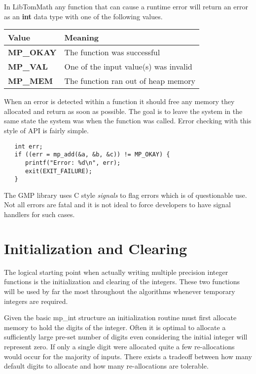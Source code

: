 \documentclass[b5paper]{book}
\begin{document}
In LibTomMath any function that can cause a runtime error will return an error as an \textbf{int} data type with one of the 
following values.

  
\begin{center}
\begin{tabular}{|l|l|}
\hline \textbf{Value} & \textbf{Meaning} \\
\hline \textbf{MP\_OKAY} & The function was successful \\
\hline \textbf{MP\_VAL}  & One of the input value(s) was invalid \\
\hline \textbf{MP\_MEM}  & The function ran out of heap memory \\
\hline
\end{tabular}
\end{center}

When an error is detected within a function it should free any memory they allocated and return as soon as possible.  The goal
is to leave the system in the same state the system was when the function was called.  Error checking with this style of API is fairly simple.

\begin{verbatim}
   int err;
   if ((err = mp_add(&a, &b, &c)) != MP_OKAY) {
      printf("Error: %d\n", err);
      exit(EXIT_FAILURE);
   }
\end{verbatim}

The GMP library uses C style \textit{signals} to flag errors which is of questionable use.  Not all errors are fatal 
and it is not ideal to force developers to have signal handlers for such cases.

\section{Initialization and Clearing}
The logical starting point when actually writing multiple precision integer functions is the initialization and 
clearing of the integers.  These two functions will be used by far the most throughout the algorithms whenever 
temporary integers are required.

Given the basic mp\_int structure an initialization routine must first allocate memory to hold the digits of
the integer.  Often it is optimal to allocate a sufficiently large pre-set number of digits even considering
the initial integer will represent zero.  If only a single digit were allocated quite a few re-allocations
would occur for the majority of inputs.  There exists a tradeoff between how many default digits to allocate
and how many re-allocations are tolerable.  
\end{document}
